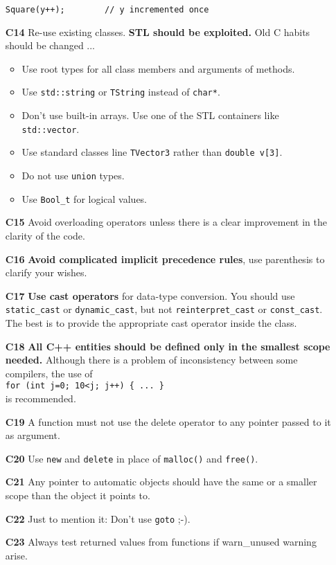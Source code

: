 \documentclass[a4paper,10pt]{article}
\begin{document}
\begin{itemize}
\begin{verbatim}
Square(y++);        // y incremented once
  \end{verbatim}
\item[\bf C14] Re-use existing classes. {\bf STL should be exploited.} Old
  C habits should be changed ...
  \begin{itemize}
    \item Use root types for all class members and arguments of methods.
    \item Use {\tt std::string} or {\tt TString} instead of {\tt char*}.
    \item Don't use built-in arrays. Use one of the STL containers like
          {\tt std::vector}.
    \item Use standard classes line {\tt TVector3} rather than {\tt double v[3]}.
    \item Do not use {\tt union} types.
    \item Use {\tt Bool\_t} for logical values.
  \end{itemize}
\item[\bf C15] Avoid overloading operators unless there is a clear improvement
  in the clarity of the code.
\item[\bf C16] {\bf Avoid complicated implicit precedence rules}, use parenthesis
  to clarify your wishes.
\item[\bf C17] {\bf Use cast operators} for data-type conversion. You should use
  {\tt static\_cast} or {\tt dynamic\_cast}, but not {\tt reinterpret\_cast} or
  {\tt const\_cast}. The best is to provide the appropriate cast operator inside
  the class.
\item[\bf C18] {\bf All C++ entities should be defined only in the smallest
    scope needed.} Although there is a problem of inconsistency between some
  compilers, the use of\\
  {\tt for (int j=0; 10<j; j++) \{ ... \}}\\
  is recommended.
\item[\bf C19] A function must not use the delete operator to any pointer
  passed to it as argument.
\item[\bf C20] Use {\tt new} and {\tt delete} in place of {\tt malloc()} and
  {\tt free()}.
\item[\bf C21] Any pointer to automatic objects should have the same or a
  smaller scope than the object it points to.
\item[\bf C22] Just to mention it: Don't use {\tt goto} ;-).
\item[\bf C23] Always test returned values from functions if warn\_unused
    warning arise.
\end{itemize}
\end{document}
